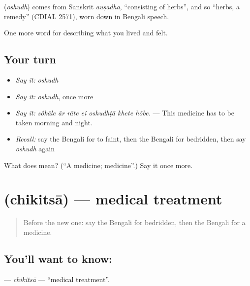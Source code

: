 \begin{cousinweb}
\textbf{} (\emph{oshudh}) comes from Sanskrit \emph{auṣadha}, \textquotedblleft{}consisting of herbs\textquotedblright{}, and so \textquotedblleft{}herbs, a remedy\textquotedblright{} (CDIAL 2571), worn down in Bengali speech.
\end{cousinweb}

\begin{grammarlens}[title={What you've built}]
One more word for describing what you lived and felt.
\end{grammarlens}

\subsection*{Your turn}
\begin{itemize}
\raggedright
  \item \emph{Say it:} \emph{oshudh}
  \item \emph{Say it:} \emph{oshudh}, once more
  \item \emph{Say it:} \emph{sôkāle ār rāte ei oshudhṭā khete hôbe.} — This medicine has to be taken morning and night.
  \item \emph{Recall:} say the Bengali for to faint, then the Bengali for bedridden, then say \emph{oshudh} again
\end{itemize}

\begin{tcolorbox}[breakable,colback=teal!4,colframe=teal!35!black,title={Before you move on}]
What does  mean? (\textquotedblleft{}A medicine; medicine\textquotedblright{}.) Say it once more.
\end{tcolorbox}
\section[\texorpdfstring{\bn{চিকিৎসা} (chikitsā)}{চিকিৎসা (chikitsā)}]{ (chikitsā) — medical treatment}

\label{lesson:BN-C472-chikitsa}



\begin{quote}
Before the new one: say the Bengali for bedridden, then the Bengali for a medicine.
\end{quote}

\subsection*{You'll want to know: }
\textbf{} — \emph{chikitsā} — \textquotedblleft{}medical treatment\textquotedblright{}.

